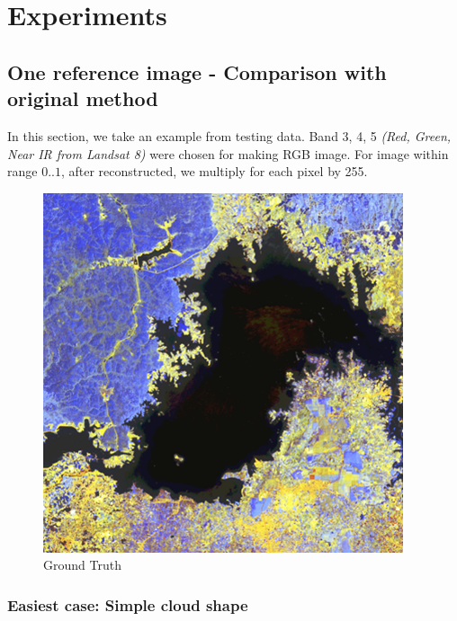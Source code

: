 \section{Experiments}

\subsection{One reference image - Comparison with original method}\label{experiment_improvedModel}

In this section, we take an example from testing data. Band 3, 4, 5 \textit{(Red, Green, Near IR from Landsat 8)} were chosen for making RGB image. For image within range $0..1$, after reconstructed, we multiply for each pixel by 255.
\begin{figure}[]
	\includegraphics[width=0.7\linewidth]{figures/groud_truth.png}
	\centering
	\caption{Ground Truth}
\end{figure}

\subsubsection{Easiest case: Simple cloud shape}

